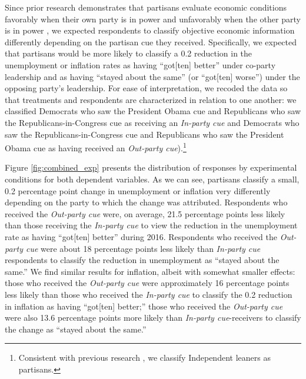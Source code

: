 \documentclass[12pt, letterpaper]{article}
\begin{document}
Since prior research demonstrates that partisans evaluate economic conditions favorably when their own party is in power and unfavorably when the other party is in power \citep[e.g.][]{bartels_2002,bisgaard2015bias}, we expected respondents to classify objective economic information differently depending on the partisan cue they received. Specifically, we expected that partisans would be more likely to classify a 0.2 reduction in the unemployment or inflation rates as having ``got[ten] better'' under co-party leadership and as having ``stayed about the same'' (or ``got[ten] worse'') under the opposing party's leadership. For ease of interpretation, we recoded the data so that treatments and respondents are characterized in relation to one another: we classified Democrats who saw the President Obama cue and Republicans who saw the Republicans-in-Congress cue as receiving an \textit{In-party cue} and Democrats who saw the Republicans-in-Congress cue and Republicans who saw the President Obama cue as having received an \textit{Out-party cue}).\footnote{Consistent with previous research \citep[e.g.,][]{keithetal_1992}, we classify Independent leaners as partisans.} 

Figure \ref{fig:combined_exp} presents the distribution of responses by experimental conditions for both dependent variables. As we can see, partisans classify a small, 0.2 percentage point change in unemployment or inflation very differently depending on the party to which the change was attributed. Respondents who received the \textit{Out-party cue} were, on average, 21.5 percentage points less likely than those receiving the \textit{In-party cue} to view the reduction in the unemployment rate as having ``got[ten] better'' during 2016. Respondents who received the \textit{Out-party cue} were about 18 percentage points less likely than \textit{In-party cue} respondents to classify the reduction in unemployment as ``stayed about the same.'' We find similar results for inflation, albeit with somewhat smaller effects: those who received the \textit{Out-party cue} were approximately 16 percentage points less likely than those who received the \textit{In-party cue} to classify the 0.2 reduction in inflation as having ``got[ten] better;'' those who received the \textit{Out-party cue} were also 13.6 percentage points more likely than \textit{In-party cue}-receivers to classify the change as ``stayed about the same.''
\end{document}
